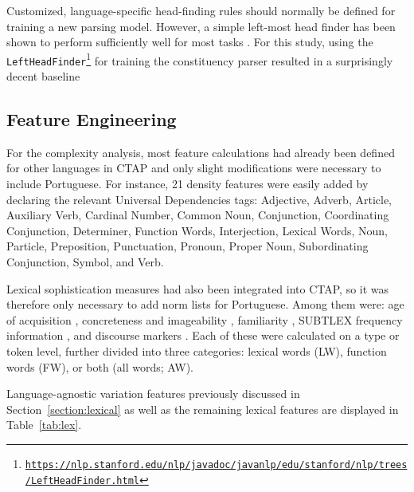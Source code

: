 Customized, language-specific head-finding rules should normally be defined for training a new parsing model. However, a simple left-most head finder has been shown to perform sufficiently well for most tasks \citep{vadas2011-parsing}. For this study, using the \texttt{LeftHeadFinder}\footnote{\texttt{\url{https://nlp.stanford.edu/nlp/javadoc/javanlp/edu/stanford/nlp/trees/LeftHeadFinder.html}}} for training the constituency parser resulted in a surprisingly decent baseline

\subsection{Feature Engineering}

For the complexity analysis, most feature calculations had already been defined for other languages in CTAP and only slight modifications were necessary to include Portuguese. For instance, 21 density features were easily added by declaring the relevant Universal Dependencies tags: Adjective, Adverb, Article, Auxiliary Verb, Cardinal Number, Common Noun, Conjunction, Coordinating Conjunction, Determiner, Function Words, Interjection, Lexical Words, Noun, Particle, Preposition, Punctuation, Pronoun, Proper Noun, Subordinating Conjunction, Symbol, and Verb.

Lexical sophistication measures had also been integrated into CTAP, so it was therefore only necessary to add norm lists for Portuguese. Among them were: age of acquisition \citep{cameirão2010}, concreteness and imageability \citep{soares2016}, familiarity \citep{marques2007}, SUBTLEX frequency information \citep{soares-subtlex}, and discourse markers \citep{mendes2018-ldmpt}. Each of these were calculated on a type or token level, further divided into three categories: lexical words (LW), function words (FW), or both (all words; AW).

Language-agnostic variation features previously discussed in Section~\ref{section:lexical} as well as the remaining lexical features are displayed in Table~\ref{tab:lex}.

